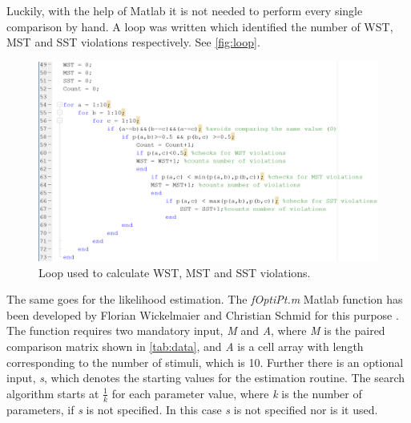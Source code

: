 Luckily, with the help of Matlab it is not needed to perform every single comparison by hand. A loop was written which identified the number of WST, MST and SST violations respectively. See \autoref{fig:loop}.
%
\begin{figure}[H]
\centering
\includegraphics[width = \textwidth]{Figure/loop} 
\caption{Loop used to calculate WST, MST and SST violations.}
\label{fig:loop}
\end{figure}
\noindent
%
The same goes for the likelihood estimation. The \textit{fOptiPt.m} Matlab function has been developed by Florian Wickelmaier and Christian Schmid for this purpose \parencite{Wickelmaier2004}. The function requires two mandatory input, \textit{M} and \textit{A}, where \textit{M} is the paired comparison matrix shown in \autoref{tab:data}, and \textit{A} is a cell array with length corresponding to the number of stimuli, which is 10. Further there is an optional input, \textit{s}, which denotes the starting values for the estimation routine. The search algorithm starts at $\frac{1}{k}$ for each parameter value, where \textit{k} is the number of parameters, if \textit{s} is not specified. In this case \textit{s} is not specified nor is it used.
\vfill